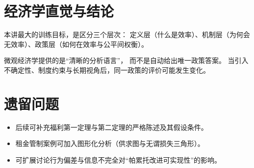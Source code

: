 \documentclass[UTF8,11pt,a4paper]{ctexart}
\begin{document}
\section{经济学直觉与结论}

本讲最大的训练目标，是区分三个层次：
定义层（什么是效率）、机制层（为何会无效率）、政策层（如何在效率与公平间权衡）。

微观经济学提供的是“清晰的分析语言”，
而不是自动给出唯一政策答案。
当引入不确定性、制度约束与长期视角后，同一政策的评价可能发生变化。

\section{遗留问题}

\begin{itemize}
  \item 后续可补充福利第一定理与第二定理的严格陈述及其假设条件。
  \item 租金管制案例可加入图形化分析（供求图与无谓损失三角形）。
  \item 可扩展讨论行为偏差与信息不完全对“帕累托改进可实现性”的影响。
\end{itemize}
\end{document}
